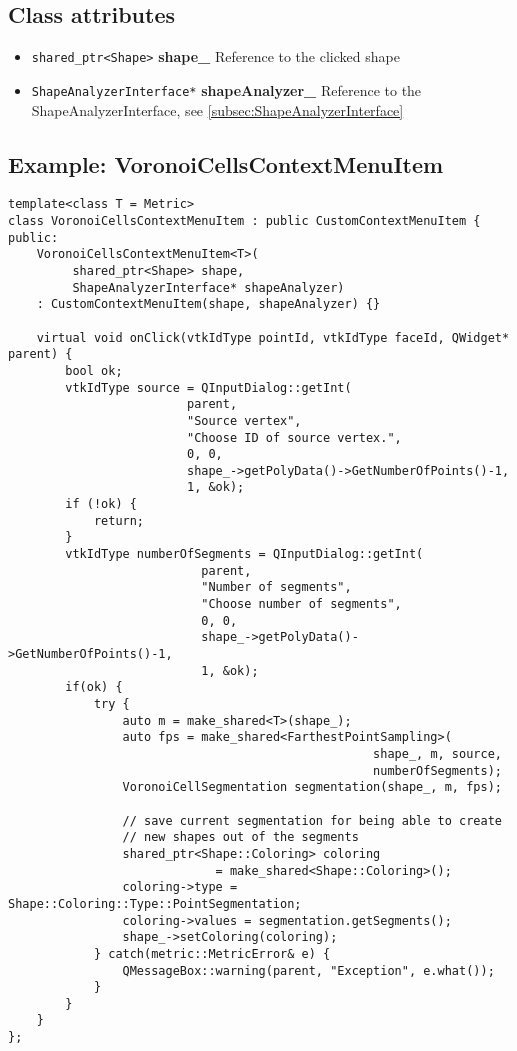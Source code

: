\subsection{Class attributes}
\begin{itemize}
	\item \texttt{shared\_ptr<Shape>} \textbf{shape\_} Reference to the clicked shape
	\item \texttt{ShapeAnalyzerInterface*} \textbf{shapeAnalyzer\_} Reference to the ShapeAnalyzerInterface, see \ref{subsec:ShapeAnalyzerInterface}
\end{itemize}

\subsection{Example: VoronoiCellsContextMenuItem}
\label{subsec:ExampleVoronoiCellsContextMenuItem}

\begin{lstlisting}[style=lstStyleCpp]
template<class T = Metric>
class VoronoiCellsContextMenuItem : public CustomContextMenuItem {
public:
    VoronoiCellsContextMenuItem<T>(
         shared_ptr<Shape> shape, 
         ShapeAnalyzerInterface* shapeAnalyzer) 
    : CustomContextMenuItem(shape, shapeAnalyzer) {}
    
    virtual void onClick(vtkIdType pointId, vtkIdType faceId, QWidget* parent) {
        bool ok;
        vtkIdType source = QInputDialog::getInt(
                         parent,
                         "Source vertex",
                         "Choose ID of source vertex.",
                         0, 0,
                         shape_->getPolyData()->GetNumberOfPoints()-1,
                         1, &ok);
        if (!ok) {
            return;
        }
        vtkIdType numberOfSegments = QInputDialog::getInt(
                           parent,
                           "Number of segments",
                           "Choose number of segments",
                           0, 0,
                           shape_->getPolyData()->GetNumberOfPoints()-1,
                           1, &ok);
        if(ok) {
            try {
                auto m = make_shared<T>(shape_);
                auto fps = make_shared<FarthestPointSampling>(
                                                   shape_, m, source, 
                                                   numberOfSegments);
                VoronoiCellSegmentation segmentation(shape_, m, fps);
                
                // save current segmentation for being able to create 
                // new shapes out of the segments
                shared_ptr<Shape::Coloring> coloring 
                             = make_shared<Shape::Coloring>();
                coloring->type = Shape::Coloring::Type::PointSegmentation;
                coloring->values = segmentation.getSegments();
                shape_->setColoring(coloring);
            } catch(metric::MetricError& e) {
                QMessageBox::warning(parent, "Exception", e.what());
            }
        }
    }
};

\end{lstlisting}

